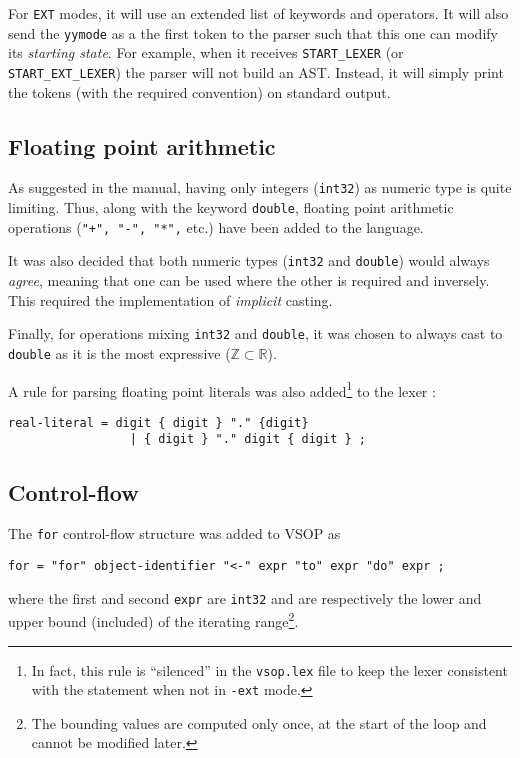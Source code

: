 \documentclass[a4paper, 12pt]{article}
\begin{document}
	For \texttt{EXT} modes, it will use an extended list of keywords and operators. It will also send the \texttt{yymode} as a the first token to the parser such that this one can modify its \emph{starting state}. For example, when it receives \texttt{START\_LEXER} (or \texttt{START\_EXT\_LEXER}) the parser will not build an AST. Instead, it will simply print the tokens (with the required convention) on standard output.
	
	\subsection{Floating point arithmetic}
	
	As suggested in the manual, having only integers (\lstinline[style=vsop]{int32}) as numeric type is quite limiting. Thus, along with the keyword \lstinline[style=vsop]{double}, floating point arithmetic operations (\lstinline[style=vsop]{"+", "-", "*",} etc.) have been added to the language.
	
	It was also decided that both numeric types (\lstinline[style=vsop]{int32} and \lstinline[style=vsop]{double}) would always \emph{agree}, meaning that one can be used where the other is required and inversely. This required the implementation of \emph{implicit} casting.
	
	Finally, for operations mixing \lstinline[style=vsop]{int32} and \lstinline[style=vsop]{double}, it was chosen to always cast to \lstinline[style=vsop]{double} as it is the most expressive ($\mathbb{Z} \subset \mathbb{R}$).
	
	A rule for parsing floating point literals was also added\footnote{In fact, this rule is \enquote{silenced} in the \texttt{vsop.lex} file to keep the lexer consistent with the statement when not in \texttt{-ext} mode.} to the lexer :
	
	\begin{lstlisting}[style=vsop]
    real-literal = digit { digit } "." {digit}
                 | { digit } "." digit { digit } ;
	\end{lstlisting}
	
	\subsection{Control-flow}
	
	The \lstinline[style=vsop]{for} control-flow structure was added to VSOP as
	\begin{lstlisting}[style=vsop]
    for = "for" object-identifier "<-" expr "to" expr "do" expr ;
	\end{lstlisting}
	where the first and second \lstinline[style=vsop]{expr} are \lstinline[style=vsop]{int32} and are respectively the lower and upper bound (included) of the iterating range\footnote{The bounding values are computed only once, at the start of the loop and cannot be modified later.}.
	
\end{document}
